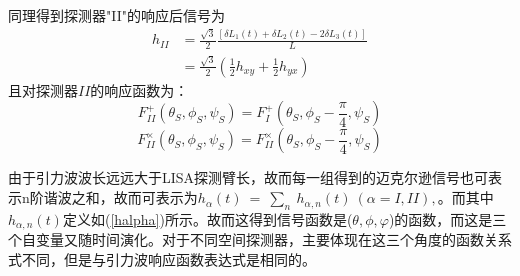 同理得到探测器"II"的响应后信号为
\begin{equation}
\begin{aligned}
h_{II} &= \frac{\sqrt{3}}{2} \frac{\left [\delta L_1(t) + \delta L_2(t) - 2 \delta L_3(t) \right]} {L}\\ 
& =\frac{\sqrt{3}}{2}(\frac{1}{2}h_{xy} +\frac{1}{2}h_{yx})
\end{aligned}
\end{equation}
且对探测器$II$的响应函数为：
\begin{equation}
F^+_{II}(\theta_S,\phi_S,\psi_S)=F_I^+(\theta_S,\phi_S-\frac{\pi}{4},\psi_S)
\end{equation}
\begin{equation}
F^{\times}_{II}(\theta_S,\phi_S,\psi_S)=F_{II}^{\times}(\theta_S,\phi_S-\frac{\pi}{4},\psi_S)
\end{equation}

由于引力波波长远远大于LISA探测臂长，故而每一组得到的迈克尔逊信号也可表示n阶谐波之和，故而可表示为$h_{\alpha}(t)\ =\ \sum_n \ h_{\alpha,n}(t) \ (\alpha=I,II),$。而其中$h_{\alpha,n}(t)$定义如(\ref{halpha})所示。故而这得到信号函数是($\theta ,\phi ,\varphi$)的函数，而这是三个自变量又随时间演化。对于不同空间探测器，主要体现在这三个角度的函数关系式不同，但是与引力波响应函数表达式是相同的。



